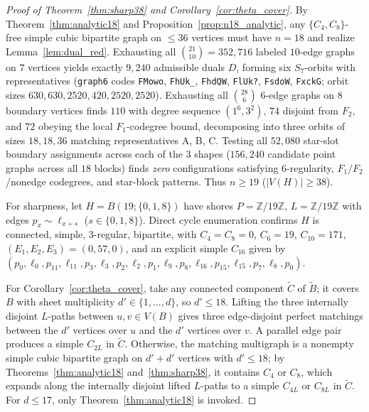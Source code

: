 \documentclass[11pt]{amsart}
\theoremstyle{definition}
\theoremstyle{remark}
\newcommand{\Z}{\mathbb{Z}}
\begin{document}
\begin{proof}[Proof of Theorem~\ref{thm:sharp38} and Corollary~\ref{cor:theta_cover}]
By Theorem~\ref{thm:analytic18} and Proposition~\ref{prop:n18_analytic}, any $\{C_4, C_8\}$-free simple cubic bipartite graph on $\le 36$ vertices must have $n=18$ and realize Lemma~\ref{lem:dual_red}. Exhausting all $\binom{21}{10} = 352{,}716$ labeled $10$-edge graphs on $7$ vertices yields exactly $9{,}240$ admissible duals $D$, forming six $S_7$-orbits with representatives (\texttt{graph6} codes \texttt{FMowo}, \texttt{FhUk\_}, \texttt{FhdQW}, \texttt{FlUk?}, \texttt{FsdoW}, \texttt{FxckG}; orbit sizes $630, 630, 2520, 420, 2520, 2520$). Exhausting all $\binom{28}{6}$ $6$-edge graphs on $8$ boundary vertices finds $110$ with degree sequence $(1^6, 3^2)$, $74$ disjoint from $F_2$, and $72$ obeying the local $F_1$-codegree bound, decomposing into three orbits of sizes $18, 18, 36$ matching representatives A, B, C. Testing all $52{,}080$ star-slot boundary assignments across each of the $3$ shapes ($156{,}240$ candidate point graphs across all $18$ blocks) finds \emph{zero} configurations satisfying $6$-regularity, $F_1/F_2$/nonedge codegrees, and star-block patterns. Thus $n \ge 19$ ($|V(H)| \ge 38$).

For sharpness, let $H = B(19; \{0,1,8\})$ have shores $P = \Z/19\Z$, $L = \Z/19\Z$ with edges $p_x \sim \ell_{x+s}$ ($s \in \{0,1,8\}$). Direct cycle enumeration confirms $H$ is connected, simple, $3$-regular, bipartite, with $C_4 = C_8 = 0$, $C_6 = 19$, $C_{10} = 171$, $(E_1, E_2, E_3) = (0, 57, 0)$, and an explicit simple $C_{16}$ given by $(p_0, \ell_0, p_{11}, \ell_{11}, p_3, \ell_3, p_2, \ell_2, p_1, \ell_9, p_8, \ell_{16}, p_{15}, \ell_{15}, p_7, \ell_8, p_0)$.

For Corollary~\ref{cor:theta_cover}, take any connected component $\widetilde{C}$ of $\widetilde{B}$; it covers $B$ with sheet multiplicity $d' \in \{1,\dots,d\}$, so $d' \le 18$. Lifting the three internally disjoint $L$-paths between $u, v \in V(B)$ gives three edge-disjoint perfect matchings between the $d'$ vertices over $u$ and the $d'$ vertices over $v$. A parallel edge pair produces a simple $C_{2L}$ in $\widetilde{C}$. Otherwise, the matching multigraph is a nonempty simple cubic bipartite graph on $d' + d'$ vertices with $d' \le 18$; by Theorems~\ref{thm:analytic18} and~\ref{thm:sharp38}, it contains $C_4$ or $C_8$, which expands along the internally disjoint lifted $L$-paths to a simple $C_{4L}$ or $C_{8L}$ in $\widetilde{C}$. For $d \le 17$, only Theorem~\ref{thm:analytic18} is invoked.
\end{proof}
\end{document}
